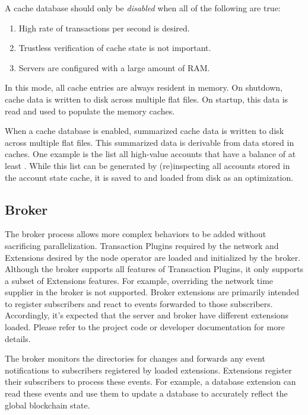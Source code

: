 A cache database should only be \emph{disabled} when all of the following are true:

\begin{enumerate}
	\item{High rate of transactions per second is desired.}
	\item{Trustless verification of cache state is not important.}
	\item{Servers are configured with a large amount of RAM.}
\end{enumerate}

In this mode, all cache entries are always resident in memory.
On shutdown, cache data is written to disk across multiple flat files.
On startup, this data is read and used to populate the memory caches.

When a cache database is enabled, summarized cache data is written to disk across multiple flat files.
This summarized data is derivable from data stored in caches.
One example is the list all high-value accounts that have a balance of at least .
While this list can be generated by (re)inspecting all accounts stored in the account state cache, it is saved to and loaded from disk as an optimization.

\subsection{Broker}

The broker process allows more complex \codenamespace behaviors to be added without sacrificing parallelization.
Transaction Plugins required by the network and \codenamespace Extensions desired by the node operator are loaded and initialized by the broker.
Although the broker supports all features of Transaction Plugins, it only supports a subset of \codenamespace Extensions features.
For example, overriding the network time supplier in the broker is not supported.
Broker extensions are primarily intended to register subscribers and react to events forwarded to those subscribers.
Accordingly, it's expected that the server and broker have different extensions loaded.
Please refer to the project code or developer documentation for more details.

The broker monitors the  directories for changes and forwards any event notifications to subscribers registered by loaded extensions.
Extensions register their subscribers to process these events.
For example, a database extension can read these events and use them to update a database to accurately reflect the global blockchain state.

